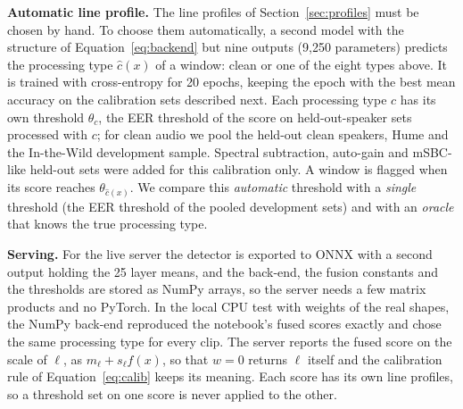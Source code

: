 \documentclass[10pt,a4paper,twocolumn]{article}
\newcommand{\llr}{\ell}
\begin{document}
\textbf{Automatic line profile.} The line profiles of Section~\ref{sec:profiles} must be chosen by hand. To choose them automatically, a second model with the structure of Equation~\ref{eq:backend} but nine outputs (9,250 parameters) predicts the processing type $\hat c(x)$ of a window: clean or one of the eight types above. It is trained with cross-entropy for 20 epochs, keeping the epoch with the best mean accuracy on the calibration sets described next. Each processing type $c$ has its own threshold $\theta_c$, the EER threshold of the score on held-out-speaker sets processed with $c$; for clean audio we pool the held-out clean speakers, Hume and the In-the-Wild development sample. Spectral subtraction, auto-gain and mSBC-like held-out sets were added for this calibration only. A window is flagged when its score reaches $\theta_{\hat c(x)}$. We compare this \emph{automatic} threshold with a \emph{single} threshold (the EER threshold of the pooled development sets) and with an \emph{oracle} that knows the true processing type.

\textbf{Serving.} For the live server the detector is exported to ONNX with a second output holding the 25 layer means, and the back-end, the fusion constants and the thresholds are stored as NumPy arrays, so the server needs a few matrix products and no PyTorch. In the local CPU test with weights of the real shapes, the NumPy back-end reproduced the notebook's fused scores exactly and chose the same processing type for every clip. The server reports the fused score on the scale of $\llr$, as $m_{\llr}+s_{\llr}f(x)$, so that $w=0$ returns $\llr$ itself and the calibration rule of Equation~\ref{eq:calib} keeps its meaning. Each score has its own line profiles, so a threshold set on one score is never applied to the other.
\end{document}
